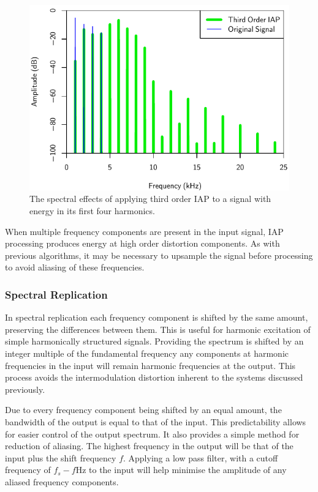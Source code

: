 			\begin{figure}[h!]
				\centering
				\includegraphics{chapter5/Images/IAP3Spectra.pdf}
				\caption{The spectral effects of applying third order IAP to a signal with energy in its 
				         first four harmonics.}
				\label{fig:IAP3Spectra}
			\end{figure}

			When multiple frequency components are present in the input signal, IAP processing produces energy
			at high order distortion components. As with previous algorithms, it may be necessary to upsample
			the signal before processing to avoid aliasing of these frequencies.

		\subsubsection*{Spectral Replication}
			In spectral replication each frequency component is shifted by the same amount, preserving the
			differences between them. This is useful for harmonic excitation of simple harmonically structured
			signals. Providing the spectrum is shifted by an integer multiple of the fundamental frequency any
			components at harmonic frequencies in the input will remain harmonic frequencies at the output.
			This process avoids the intermodulation distortion inherent to the systems discussed previously. 

			Due to every frequency component being shifted by an equal amount, the bandwidth of the output is
			equal to that of the input. This predictability allows for easier control of the output spectrum.
			It also provides a simple method for reduction of aliasing. The highest frequency in the output
			will be that of the input plus the shift frequency $f$. Applying a low pass filter, with a cutoff
			frequency of $f_{s} - f$Hz to the input will help minimise the amplitude of any aliased frequency
			components.

